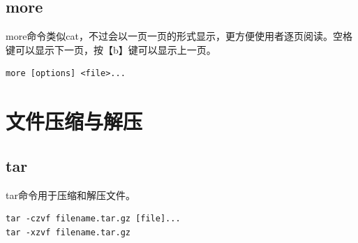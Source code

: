 \documentclass[12pt, openany, oneside]{book}
\begin{document}
\subsection{more}

more命令类似cat，不过会以一页一页的形式显示，更方便使用者逐页阅读。空格键可以显示下一页，按【b】键可以显示上一页。

\vspace{-0.5cm}

\begin{lstlisting}
more [options] <file>...
\end{lstlisting}

\begin{table}[H]
    \centering
    \caption{more参数说明}
\end{table}

\newpage

\section{文件压缩与解压}

\subsection{tar}

tar命令用于压缩和解压文件。

\vspace{-0.5cm}

\begin{lstlisting}
tar -czvf filename.tar.gz [file]...
tar -xzvf filename.tar.gz
\end{lstlisting}
\end{document}
